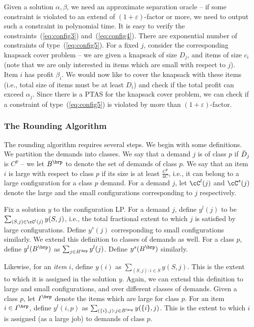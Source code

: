 Given a solution $\alpha, \beta$, we need an approximate separation oracle -- if some constraint is violated to an extend of $(1+\varepsilon)$-factor
or more, we need to output such a constraint in polynomial time. It is easy to verify the constraints~(\ref{eq:config3}) and~(\ref{eq:config4}). There
are exponential number of constraints of type~(\ref{eq:config5}). For a fixed $j$, consider the corresponding knapsack cover problem -- we are given
a knapsack of size $D_j$, and items of size $c_i$ (note that we are only interested in items which are small with respect to $j$). Item $i$ has 
profit $\beta_i$. We would now like to cover the knapsack with these items (i.e., total size of items must be at least $D_i$) and check if the total
profit can exceed $\alpha_j$. Since there is a PTAS for the knapsack cover problem, we can check if a constraint of type~(\ref{eq:config5}) 
is violated by more than $(1+\varepsilon)$-factor. 

\subsubsection{The Rounding Algorithm}

The rounding algorithm requires several steps. We begin with some definitions. We partition the demands into classes.
We say that a demand $j$ is of class $p$ if
${\bar D}_j$ is $C^p$ -- we let $B^\brp$ to denote the set of demands of class $p$.
We say that an item $i$ is large with respect to class $p$ if its size is at least $\frac{C^p}{4C}$, i.e., it can belong to a large configuration for a class $p$ demand.  For a demand $j$, let $\cC^l(j)$ and $\cC^s(j)$ denote the large and the small configurations corresponding to $j$ respectively.

Fix a solution $y$ to the configuration LP. For a demand $j$, define $y^l(j)$ to be $\sum_{(S,j) \in \cC^l(j)} y(S,j)$, i.e., the total fractional extent to which $j$ is satisfied by large configurations. Define $y^s(j)$ corresponding to small configurations similarly. We extend this definition to classes of demands as well. For a class $p$, define $y^l(B^\brp)$ as $\sum_{j \in B^\brp} y^l(j)$. Define $y^s(B^\brp)$ similarly.

Likewise, for an \emph{item} $i$, define $y(i)$ as $\sum_{(S,j): i \in S} y(S,j)$. This is the extent to which it is assigned in the solution $y$. Again, we can extend this definition to large and small configurations, and over different classes of demands. Given a class $p$, let $I^\brp$ denote the items which are large for class $p$. For an item $i \in I^\brp$, define $y^l(i,p)$ as $\sum_{(\{i\}, j): j \in B^\brp} y(\{i\}, j)$. This is the extent to which $i$ is assigned (as a large job) to demands of class $p$.

